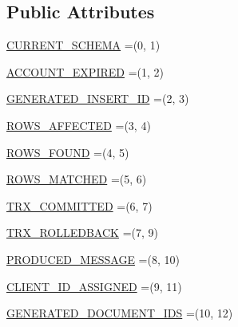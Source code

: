 \subsection*{Public Attributes}
\begin{DoxyCompactItemize}
\item 
\mbox{\hyperlink{enumcom_1_1mysql_1_1cj_1_1x_1_1protobuf_1_1_mysqlx_notice_1_1_session_state_changed_1_1_parameter_a617dc65011a550d95aa762ffd25d4a62}{C\+U\+R\+R\+E\+N\+T\+\_\+\+S\+C\+H\+E\+MA}} =(0, 1)
\item 
\mbox{\hyperlink{enumcom_1_1mysql_1_1cj_1_1x_1_1protobuf_1_1_mysqlx_notice_1_1_session_state_changed_1_1_parameter_a5f84cbc99bdd8004cdc8264d7bbabd92}{A\+C\+C\+O\+U\+N\+T\+\_\+\+E\+X\+P\+I\+R\+ED}} =(1, 2)
\item 
\mbox{\hyperlink{enumcom_1_1mysql_1_1cj_1_1x_1_1protobuf_1_1_mysqlx_notice_1_1_session_state_changed_1_1_parameter_af808d4d90a857e2e0a273ef781f7f036}{G\+E\+N\+E\+R\+A\+T\+E\+D\+\_\+\+I\+N\+S\+E\+R\+T\+\_\+\+ID}} =(2, 3)
\item 
\mbox{\hyperlink{enumcom_1_1mysql_1_1cj_1_1x_1_1protobuf_1_1_mysqlx_notice_1_1_session_state_changed_1_1_parameter_a00d99fc0bb95719f97f6d662e775ea5f}{R\+O\+W\+S\+\_\+\+A\+F\+F\+E\+C\+T\+ED}} =(3, 4)
\item 
\mbox{\hyperlink{enumcom_1_1mysql_1_1cj_1_1x_1_1protobuf_1_1_mysqlx_notice_1_1_session_state_changed_1_1_parameter_a2d00ef5a978b6b7bcbb4af2cf6b43ca3}{R\+O\+W\+S\+\_\+\+F\+O\+U\+ND}} =(4, 5)
\item 
\mbox{\hyperlink{enumcom_1_1mysql_1_1cj_1_1x_1_1protobuf_1_1_mysqlx_notice_1_1_session_state_changed_1_1_parameter_acf6111148e46cb721a925d51df601592}{R\+O\+W\+S\+\_\+\+M\+A\+T\+C\+H\+ED}} =(5, 6)
\item 
\mbox{\hyperlink{enumcom_1_1mysql_1_1cj_1_1x_1_1protobuf_1_1_mysqlx_notice_1_1_session_state_changed_1_1_parameter_a8ac08adb2b5e8c39e1c7041f3008efff}{T\+R\+X\+\_\+\+C\+O\+M\+M\+I\+T\+T\+ED}} =(6, 7)
\item 
\mbox{\hyperlink{enumcom_1_1mysql_1_1cj_1_1x_1_1protobuf_1_1_mysqlx_notice_1_1_session_state_changed_1_1_parameter_a17edf54c2110f1fa934224070d124c23}{T\+R\+X\+\_\+\+R\+O\+L\+L\+E\+D\+B\+A\+CK}} =(7, 9)
\item 
\mbox{\hyperlink{enumcom_1_1mysql_1_1cj_1_1x_1_1protobuf_1_1_mysqlx_notice_1_1_session_state_changed_1_1_parameter_ad46745314c6483db2cac09184f747103}{P\+R\+O\+D\+U\+C\+E\+D\+\_\+\+M\+E\+S\+S\+A\+GE}} =(8, 10)
\item 
\mbox{\hyperlink{enumcom_1_1mysql_1_1cj_1_1x_1_1protobuf_1_1_mysqlx_notice_1_1_session_state_changed_1_1_parameter_a38aa2a1f1b4f3c44435b1533b4882f39}{C\+L\+I\+E\+N\+T\+\_\+\+I\+D\+\_\+\+A\+S\+S\+I\+G\+N\+ED}} =(9, 11)
\item 
\mbox{\hyperlink{enumcom_1_1mysql_1_1cj_1_1x_1_1protobuf_1_1_mysqlx_notice_1_1_session_state_changed_1_1_parameter_af2e4a53f708af056564d1f6f62f2a891}{G\+E\+N\+E\+R\+A\+T\+E\+D\+\_\+\+D\+O\+C\+U\+M\+E\+N\+T\+\_\+\+I\+DS}} =(10, 12)
\end{DoxyCompactItemize}
